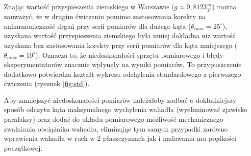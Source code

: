 \documentclass[a4paper]{article}
\newlength{\du}
\begin{document}
Znając wartość przyspieszenia ziemskiego w Warszawie ($g\approx9,8123 \tfrac{m}{s^2}$)
można zauważyć, że w drugim ćwiczeniu pomimo zastosowania korekty na anharmoniczność drgań
przy serii pomiarów dla dużego kąta ($\theta_{max} = 25^\circ$), uzyskana wartość
przyspieszenia ziemskiego była mniej dokładna niż wartość uzyskana bez zastosowania
korekty przy serii pomiarów dla kąta mniejszego ($\theta_{max} = 10^\circ$).
Oznacza to, że niedoskonałości sprzętu pomiarowego i błędy eksperymentatorów znacznie
wpłynęły na wyniki pomiarów.
To przypuszczenie dodatkowo potwierdza kształt wykresu odchylenia standardowego
z pierwszego ćwiczenia (rysunek \ref{fig:std}).


Aby zmniejszyć niedoskonałości pomiarów należałoby zadbać o dokładniejszy sposób odczytu
kąta maksymalnego wychylenia wahadła (wyeliminować zjawisko paralaksy) oraz dodać do
układu pomiarowego możliwość mechanicznego zwalniania obciążnika wahadła, eliminując tym
samym przypadki zarówno wprawienia wahadła w ruch w 2 płaszczyznach 
jak i nadawania mu prędkości początkowej.
\end{document}
